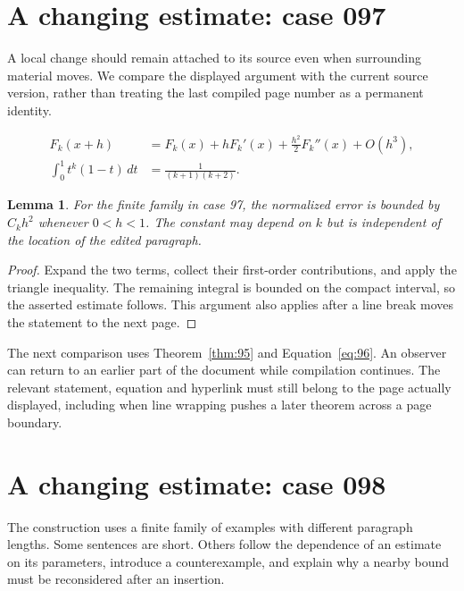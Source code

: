 \documentclass[a4paper,10pt]{article}
\newtheorem{lemma}[theorem]{Lemma}
\begin{document}
\lipsum[3]

\section{A changing estimate: case 097}\label{unit:96}
A local change should remain attached to its source even when surrounding material moves. We compare the displayed argument with the current source version, rather than treating the last compiled page number as a permanent identity.

\lipsum[19-20]
\begin{align}\label{eq:96}
 F_k(x+h)&=F_k(x)+hF_k'(x)+\frac{h^2}{2}F_k''(x)+O(h^3),\\
 \int_0^1 t^k(1-t)\,dt&=\frac{1}{(k+1)(k+2)}.
\end{align}
\begin{lemma}\label{thm:96}
For the finite family in case 97, the normalized error is bounded by $C_k h^2$ whenever $0<h<1$. The constant may depend on $k$ but is independent of the location of the edited paragraph.
\end{lemma}
\begin{proof}
Expand the two terms, collect their first-order contributions, and apply the
triangle inequality. The remaining integral is bounded on the compact interval,
so the asserted estimate follows. This argument also applies after a line break
moves the statement to the next page.
\end{proof}
The next comparison uses Theorem~\ref{thm:95} and Equation~\ref{eq:96}. An observer can return to an earlier part of the document while compilation continues. The relevant statement, equation and hyperlink must still belong to the page actually displayed, including when line wrapping pushes a later theorem across a page boundary.

\lipsum[8]

\section{A changing estimate: case 098}\label{unit:97}
The construction uses a finite family of examples with different paragraph lengths. Some sentences are short. Others follow the dependence of an estimate on its parameters, introduce a counterexample, and explain why a nearby bound must be reconsidered after an insertion.
\end{document}
